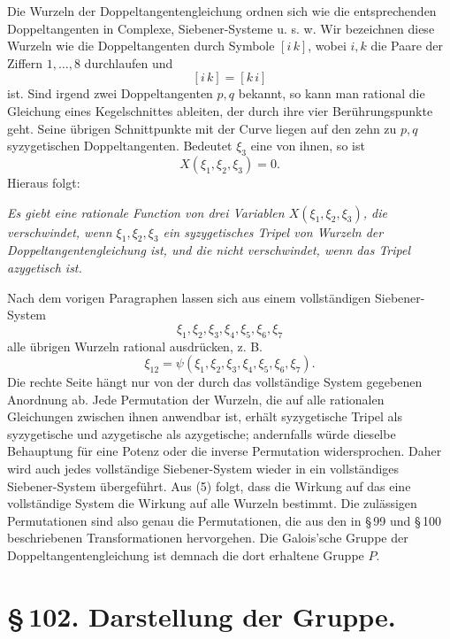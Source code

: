 \documentclass[11pt]{article}
\providecommand{\pair}[2]{[#1\,#2]}
\begin{document}
Die Wurzeln der Doppeltangentengleichung ordnen sich wie die entsprechenden Doppeltangenten in Complexe, Siebener-Systeme u. s. w. Wir bezeichnen diese Wurzeln wie die Doppeltangenten durch Symbole \(\pair{i}{k}\), wobei \(i,k\) die Paare der Ziffern \(1,\ldots,8\) durchlaufen und
\[
 \pair{i}{k}=\pair{k}{i}
\]
ist. Sind irgend zwei Doppeltangenten \(p,q\) bekannt, so kann man rational die Gleichung eines Kegelschnittes ableiten, der durch ihre vier Berührungspunkte geht. Seine übrigen Schnittpunkte mit der Curve liegen auf den zehn zu \(p,q\) syzygetischen Doppeltangenten. Bedeutet \(\xi_3\) eine von ihnen, so ist
\begin{equation}
 X(\xi_1,\xi_2,\xi_3)=0. \tag{3}
\end{equation}
Hieraus folgt:

\emph{Es giebt eine rationale Function von drei Variablen \(X(\xi_1,\xi_2,\xi_3)\), die verschwindet, wenn \(\xi_1,\xi_2,\xi_3\) ein syzygetisches Tripel von Wurzeln der Doppeltangentengleichung ist, und die nicht verschwindet, wenn das Tripel azygetisch ist.}

Nach dem vorigen Paragraphen lassen sich aus einem vollständigen Siebener-System
\begin{equation}
 \xi_1,\xi_2,\xi_3,\xi_4,\xi_5,\xi_6,\xi_7 \tag{4}
\end{equation}
alle übrigen Wurzeln rational ausdrücken, z. B.
\begin{equation}
 \xi_{12}=\psi(\xi_1,\xi_2,\xi_3,\xi_4,\xi_5,\xi_6,\xi_7). \tag{5}
\end{equation}
Die rechte Seite hängt nur von der durch das vollständige System gegebenen Anordnung ab. Jede Permutation der Wurzeln, die auf alle rationalen Gleichungen zwischen ihnen anwendbar ist, erhält syzygetische Tripel als syzygetische und azygetische als azygetische; andernfalls würde dieselbe Behauptung für eine Potenz oder die inverse Permutation widersprochen. Daher wird auch jedes vollständige Siebener-System wieder in ein vollständiges Siebener-System übergeführt. Aus (5) folgt, dass die Wirkung auf das eine vollständige System die Wirkung auf alle Wurzeln bestimmt. Die zulässigen Permutationen sind also genau die Permutationen, die aus den in \S\,99 und \S\,100 beschriebenen Transformationen hervorgehen. Die Galois'sche Gruppe der Doppeltangentengleichung ist demnach die dort erhaltene Gruppe \(P\).

\section*{\S\,102. Darstellung der Gruppe.}
\end{document}
